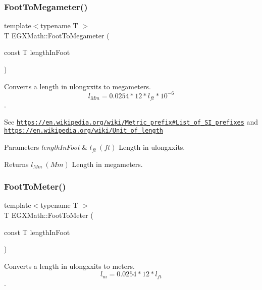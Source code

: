 \subsubsection{\texorpdfstring{Foot\+To\+Megameter()}{FootToMegameter()}}
{\footnotesize\ttfamily template$<$typename T $>$ \\
T E\+G\+X\+Math\+::\+Foot\+To\+Megameter (\begin{DoxyParamCaption}\item[{const T}]{length\+In\+Foot }\end{DoxyParamCaption})}



Converts a length in ulongxxits to megameters. \[ l_{Mm}=0.0254 * 12 * l_{ft} * 10^{-6} \]. 

See \href{https://en.wikipedia.org/wiki/Metric_prefix#List_of_SI_prefixes}{\tt https\+://en.\+wikipedia.\+org/wiki/\+Metric\+\_\+prefix\#\+List\+\_\+of\+\_\+\+S\+I\+\_\+prefixes} and \href{https://en.wikipedia.org/wiki/Unit_of_length}{\tt https\+://en.\+wikipedia.\+org/wiki/\+Unit\+\_\+of\+\_\+length} 
\begin{DoxyParams}{Parameters}
{\em length\+In\+Foot} & $ l_{ft}\ (ft)$ Length in ulongxxits. \\
\hline
\end{DoxyParams}
\begin{DoxyReturn}{Returns}
$ l_{Mm}\ (Mm)$ Length in megameters. 
\end{DoxyReturn}
\mbox{\label{group___e_g_x_math-_conversions-_length_conversions-_imperial-_foot-_s_i_ga6b4c99ec398edb961655516d6e7ffd9b}} 
\subsubsection{\texorpdfstring{Foot\+To\+Meter()}{FootToMeter()}}
{\footnotesize\ttfamily template$<$typename T $>$ \\
T E\+G\+X\+Math\+::\+Foot\+To\+Meter (\begin{DoxyParamCaption}\item[{const T}]{length\+In\+Foot }\end{DoxyParamCaption})}



Converts a length in ulongxxits to meters. \[ l_{m}=0.0254 * 12 * l_{ft} \]. 


